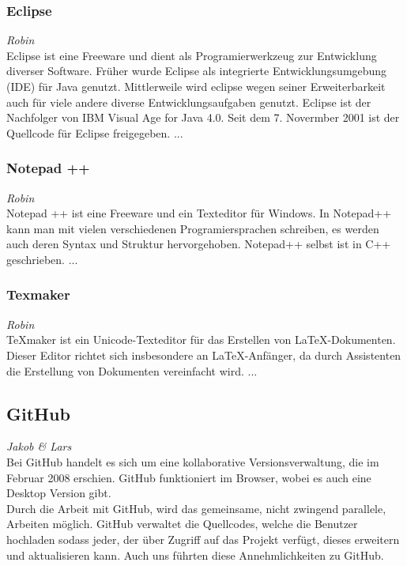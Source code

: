 \documentclass[12pt,a4paper,bibliography=totocnumbered,listof=totocnumbered]{scrartcl}
\begin{document}
\subsubsection{Eclipse}
\label{sec:Eclipse}
\emph{Robin}\\
Eclipse ist eine Freeware und dient als Programierwerkzeug zur Entwicklung diverser Software. Früher wurde Eclipse als integrierte Entwicklungsumgebung (IDE) für Java genutzt. Mittlerweile wird eclipse wegen seiner Erweiterbarkeit auch für viele andere diverse Entwicklungsaufgaben genutzt. Eclipse ist der Nachfolger von IBM Visual Age for Java 4.0. Seit dem 7. Novermber 2001 ist der Quellcode für Eclipse freigegeben. \cite{Eclipse}
...

\subsubsection{Notepad ++}
\label{sec:Notepad++}
\emph{Robin}\\
Notepad ++ ist eine Freeware und ein Texteditor für Windows. In Notepad++ kann man mit vielen verschiedenen Programiersprachen schreiben, es werden auch deren Syntax und Struktur hervorgehoben. Notepad++ selbst ist in C++ geschrieben. \cite{Notepad}
...

\subsubsection{Texmaker}
\label{sec:Texmaker}
\emph{Robin}\\
TeXmaker ist ein Unicode-Texteditor für das Erstellen von LaTeX-Dokumenten. Dieser Editor richtet sich insbesondere an LaTeX-Anfänger, da durch Assistenten die Erstellung von Dokumenten vereinfacht wird. \cite{Texmaker}
...

\subsection{GitHub}
\label{sec:GitHub}
\emph{Jakob \emph{\&} Lars}\\
Bei GitHub handelt es sich um eine kollaborative Versionsverwaltung, die im Februar 2008 erschien. GitHub funktioniert im Browser, wobei es auch eine Desktop Version gibt.\cite{wiki/GitHub} \\
Durch die Arbeit mit GitHub, wird das gemeinsame, nicht zwingend parallele, Arbeiten möglich. GitHub verwaltet die Quellcodes, welche die Benutzer hochladen sodass jeder, der über Zugriff auf das Projekt verfügt, dieses erweitern und aktualisieren kann. Auch uns führten diese Annehmlichkeiten zu GitHub.
\end{document}
